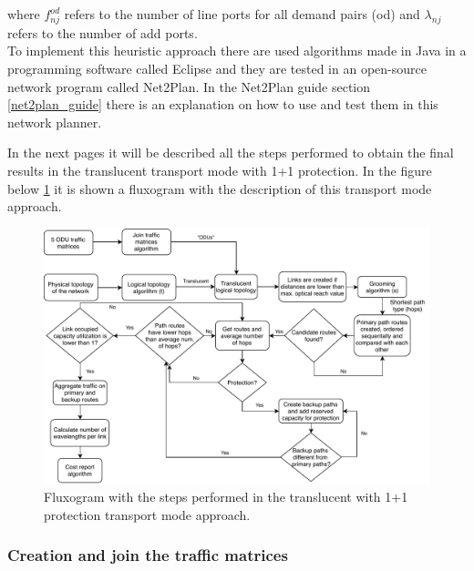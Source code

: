 \vspace{11pt}
\noindent
where $f_{nj}^{od}$ refers to the number of line ports for all demand pairs (od) and $\lambda_{nj}$ refers to the number of add ports.\\

\vspace{11pt}
To implement this heuristic approach there are used algorithms made in Java in a programming software called Eclipse and they are tested in an open-source network program called Net2Plan. In the Net2Plan guide section \ref{net2plan_guide} there is an explanation on how to use and test them in this network planner.

In the next pages it will be described all the steps performed to obtain the final results in the translucent transport mode with 1+1 protection. In the figure below \ref{fluxogram_transl_protec} it is shown a fluxogram with the description of this transport mode approach.

\begin{figure}[H]
\centering
\includegraphics[width=16cm]{sdf/heuristic/translucent_protection/figures/fluxogram_translucent_protec}
\caption{Fluxogram with the steps performed in the translucent with 1+1 protection transport mode approach.}
\label{fluxogram_transl_protec}
\end{figure}

\newpage
\subsubsection{Creation and join the traffic matrices}

